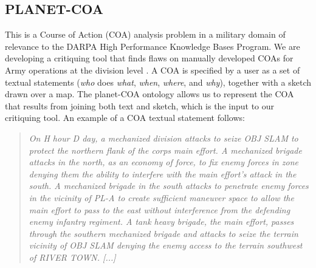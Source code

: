 \subsection{PLANET-COA}

This is a Course of Action (COA) analysis problem in a military domain of
relevance to the DARPA High Performance Knowledge Bases Program.  
We are developing a critiquing tool that finds flaws on manually 
developed COAs for Army operations at the division level 
\cite{FM-101-5}.  
A COA is specified by a user as a set of textual statements 
({\em who} does {\em what}, {\em when}, {\em where}, and {\em why}),
together with a sketch drawn over a map.  
The {\sc planet}-COA ontology allows us to represent the COA 
that results from joining both text and sketch, 
which is the input to our critiquing tool.  
An example of a COA textual statement follows:

\begin{small}
\begin{quote}
{\em 
On H hour D day, a mechanized division attacks to seize
OBJ SLAM to protect the northern flank of the corps main effort.
A mechanized brigade attacks in the north, as an economy of force,
to fix enemy forces in zone denying them the ability to interfere 
with the main effort's attack in the south.  A mechanized brigade 
in the south attacks to penetrate enemy forces in the vicinity of PL-A
to create sufficient maneuver space to allow the main effort to pass 
to the east without interference from the defending enemy infantry regiment.
A tank heavy brigade, the main effort, passes through the southern mechanized
brigade and attacks to seize the terrain vicinity of OBJ SLAM
denying the enemy access to the terrain southwest of RIVER TOWN.
[...]
}
\end{quote}
\end{small}

